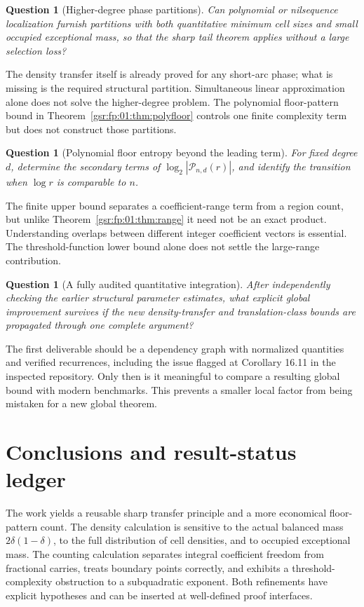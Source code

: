 \documentclass[11pt,letterpaper]{article}
\numberwithin{equation}{section}
\newtheorem{question}[theorem]{Question}
\theoremstyle{definition}
\theoremstyle{remark}
\newcommand{\1}{\mathbf 1}
\newcommand{\srctag}[1]{\texorpdfstring{\enspace\textup{[#1]}}{ [#1]}}
\newcommand{\srcnote}[2]{\par\noindent{\small\textit{Source #1, delivered #2.}}\par}
\begin{document}
\begin{question}[Higher-degree phase partitions]
Can polynomial or nilsequence localization furnish partitions with both
quantitative minimum cell sizes and small occupied exceptional mass,
so that the sharp tail theorem applies without a large selection loss?
\end{question}
The density transfer itself is already proved for any short-arc phase;
what is missing is the required structural partition. Simultaneous linear
approximation alone does not solve the higher-degree problem. The
polynomial floor-pattern bound in Theorem~\ref{gsr:fp:01:thm:polyfloor} controls one
finite complexity term but does not construct those partitions.

\begin{question}[Polynomial floor entropy beyond the leading term]
For fixed degree $d$, determine the secondary terms of
$\log_2|\mathcal P_{n,d}(r)|$, and identify the transition when
$\log r$ is comparable to $n$.
\end{question}
The finite upper bound separates a coefficient-range term from a region
count, but unlike Theorem~\ref{gsr:fp:01:thm:range} it need not be an exact product.
Understanding overlaps between different integer coefficient vectors is
essential. The threshold-function lower bound alone does not settle the
large-range contribution.

\begin{question}[A fully audited quantitative integration]
After independently checking the earlier structural parameter estimates,
what explicit global improvement survives if the new density-transfer and
translation-class bounds are propagated through one complete argument?
\end{question}
The first deliverable should be a dependency graph with normalized
quantities and verified recurrences, including the issue flagged at
Corollary 16.11 in the inspected repository. Only then is it meaningful to
compare a resulting global bound with modern benchmarks. This prevents a
smaller local factor from being mistaken for a new global theorem.

\section[{Conclusions and result-status ledger\srctag{01}}]{Conclusions and result-status ledger}\label{gsr:fz:01:sec:d16}\label{gsr:fz:01:sec:conclusion}
\srcnote{01}{Section 16}

The work yields a reusable sharp transfer principle and a more economical
floor-pattern count. The density calculation is sensitive to the actual
balanced mass $2\delta(1-\delta)$, to the full distribution of cell
densities, and to occupied exceptional mass. The counting calculation
separates integral coefficient freedom from fractional carries, treats
boundary points correctly, and exhibits a threshold-complexity obstruction
to a subquadratic exponent. Both refinements have explicit hypotheses and
can be inserted at well-defined proof interfaces.
\end{document}
